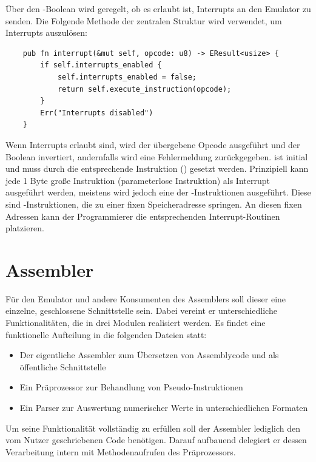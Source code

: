 Über den -Boolean wird geregelt, ob es erlaubt ist, Interrupts an den Emulator zu senden. Die Folgende Methode der zentralen Struktur wird verwendet, um Interrupts auszulösen:

\begin{verbatim}
    pub fn interrupt(&mut self, opcode: u8) -> EResult<usize> {
        if self.interrupts_enabled {
            self.interrupts_enabled = false;
            return self.execute_instruction(opcode);
        }
        Err("Interrupts disabled")
    }
\end{verbatim}

Wenn Interrupts erlaubt sind, wird der übergebene Opcode ausgeführt und der Boolean invertiert, andernfalls wird eine Fehlermeldung zurückgegeben.  ist initial  und muss durch die entsprechende Instruktion () gesetzt werden.
Prinzipiell kann jede 1 Byte große Instruktion (parameterlose Instruktion) als Interrupt ausgeführt werden, meistens wird jedoch eine der -Instruktionen ausgeführt. Diese sind -Instruktionen, die zu einer fixen Speicheradresse springen. An diesen fixen Adressen kann der Programmierer die entsprechenden Interrupt-Routinen platzieren.

\section{Assembler}

Für den Emulator und andere Konsumenten des Assemblers soll dieser eine einzelne, geschlossene Schnittstelle sein. Dabei vereint er unterschiedliche Funktionalitäten, die in drei Modulen realisiert werden. Es findet eine funktionelle Aufteilung in die folgenden Dateien statt:

\begin{itemize}
	\item Der eigentliche Assembler zum Übersetzen von Assemblycode und als öffentliche Schnittstelle
	\item Ein Präprozessor zur Behandlung von Pseudo-Instruktionen
	\item Ein Parser zur Auswertung numerischer Werte in unterschiedlichen Formaten
\end{itemize}

Um seine Funktionalität vollständig zu erfüllen soll der Assembler lediglich den vom Nutzer geschriebenen Code benötigen. Darauf aufbauend delegiert er dessen Verarbeitung intern mit Methodenaufrufen des Präprozessors.

